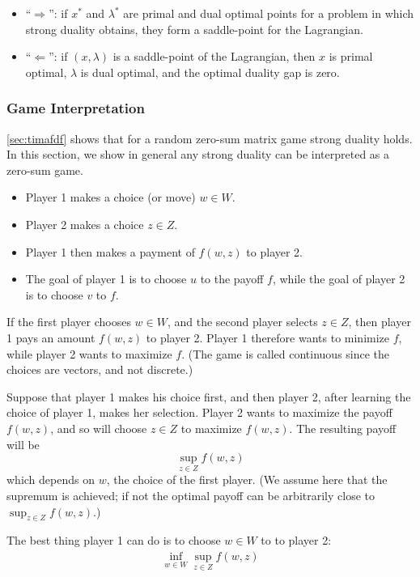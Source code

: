 \documentclass{article}
\begin{document}

\begin{itemize}
    \item ``$\Rightarrow$'': if $x^* $ and $\lambda^* $ are primal and dual optimal points for a problem in which strong duality obtains, they form a saddle-point for the Lagrangian.
    \item ``$\Leftarrow$'': if $(x, \lambda)$ is a saddle-point of the Lagrangian, then $x$ is primal optimal, $\lambda$ is dual optimal, and the optimal duality gap is zero.
\end{itemize}
\subsubsection{Game Interpretation}
\cref{sec:timafdf} shows that for a random zero-sum  matrix game strong duality holds. In this section, we show in general any strong duality can be interpreted as a  zero-sum game.
\begin{itemize}
    \item Player 1 makes a choice (or move)  $w \in W$.
    \item Player 2 makes a choice $z \in Z$. 
    \item Player 1 then makes a payment of $f(w, z)$ to player 2. 
    \item The goal of player 1 is to choose $u$ to  the payoff $f$, while the goal of player 2 is to choose $v$ to  $f$.
\end{itemize}  
If the first player chooses $w \in W$, and the second player selects $z \in Z$, then player 1 pays an amount $f(w, z)$ to player 2. Player 1 therefore wants to minimize $f$, while player 2 wants to maximize $f$. (The game is called continuous since the choices are vectors, and not discrete.)


Suppose that player 1 makes his choice first, and then player 2, after learning the choice of player 1, makes her selection. Player 2 wants to maximize the payoff $f(w, z)$, and so will choose $z \in Z$ to maximize $f(w, z)$. The resulting payoff will be $$\sup _{z \in Z} f(w, z)$$ which depends on $w$, the choice of the first player. (We assume here that the supremum is achieved; if not the optimal payoff can be arbitrarily close to $\sup _{z \in Z} f(w, z)$.) 

The best thing player 1 can do is to choose $w \in W$ to  to player 2:
\begin{align*}
\inf _{w \in W} \sup _{z \in Z} f(w, z)
\end{align*}
\end{document}
